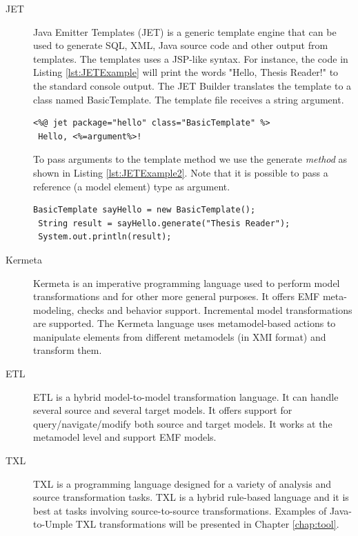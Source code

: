 \begin{description}
\item[JET]
Java Emitter Templates (JET) is a generic template engine that can be used to generate SQL, XML, Java source code and other output from templates. The templates uses a JSP-like syntax.
For instance, the code in Listing \ref{lst:JETExample} will print the words "Hello, Thesis Reader!" to the standard console output. The JET Builder translates the template to a class named BasicTemplate. The template file receives a string argument.


\begin{lstlisting}[style=java,label=lst:JETExample, caption=A basic JET Template]
<%@ jet package="hello" class="BasicTemplate" %>
 Hello, <%=argument%>!
\end{lstlisting}

To pass arguments to the template method we use the generate \textit{method} as shown in Listing \ref{lst:JETExample2}. Note that it is possible to pass a reference (a model element) type as argument. 

\begin{lstlisting}[style=java,label=lst:JETExample2, caption=Instantiating the BasicTemplate class]
 BasicTemplate sayHello = new BasicTemplate();
 String result = sayHello.generate("Thesis Reader");
 System.out.println(result);
\end{lstlisting}

\item[Kermeta]
Kermeta \cite{kermetaMain} is an imperative programming language used to perform model transformations and for other more general purposes. It offers EMF meta-modeling, checks and behavior support. Incremental model transformations are supported. The Kermeta language uses metamodel-based actions to manipulate elements from different metamodels (in XMI format) and transform them. 

\item[ETL]
ETL \cite{ETLMain}  is a hybrid model-to-model transformation language. It can handle several source and several target models. It offers support for query/navigate/modify both source and target models. It works at the metamodel level and support EMF models. 

\item[TXL]
TXL \cite{Cordy2006}  is a programming language designed for a variety of analysis and source transformation tasks. TXL is a hybrid rule-based language and it is best at tasks involving source-to-source transformations.  Examples of Java-to-Umple TXL transformations will be presented in Chapter \ref{chap:tool}.
\end{description}

